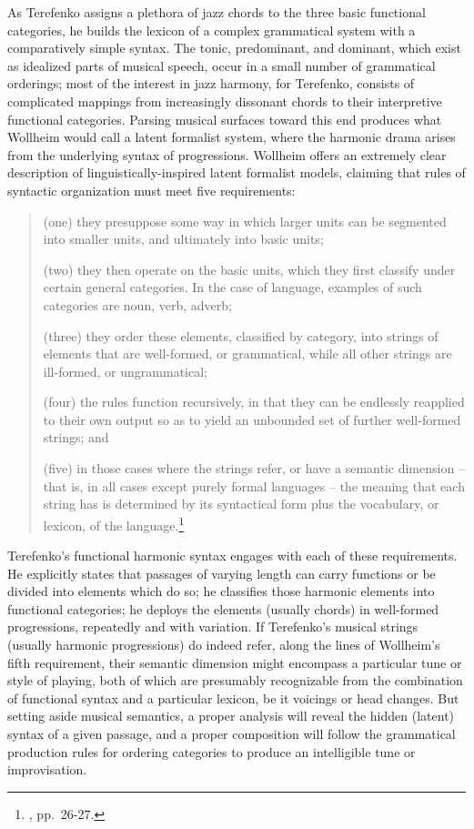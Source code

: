 As Terefenko assigns a plethora of jazz chords to the three basic functional categories, he builds the lexicon of a complex grammatical system with a comparatively simple syntax.  The tonic, predominant, and dominant, which exist as idealized parts of musical speech, occur in a small number of grammatical orderings; most of the interest in jazz harmony, for Terefenko, consists of complicated mappings from increasingly dissonant chords to their interpretive functional categories.  Parsing musical surfaces toward this end produces what Wollheim would call a latent formalist system, where the harmonic drama arises from the underlying syntax of progressions.  Wollheim offers an extremely clear description of linguistically-inspired latent formalist models, claiming that rules of syntactic organization must meet five requirements:
\begin{quote}
(one) they presuppose some way in which larger units can be segmented into smaller units, and ultimately into basic units;

(two) they then operate on the basic units, which they first classify under certain general categories.  In the case of language, examples of such categories are noun, verb, adverb;

(three) they order these elements, classified by category, into strings of elements that are well-formed, or grammatical, while all other strings are ill-formed, or ungrammatical;

(four) the rules function recursively, in that they can be endlessly reapplied to their own output so as to yield an unbounded set of further well-formed strings; and

(five) in those cases where the strings refer, or have a semantic dimension -- that is, in all cases except purely formal languages -- the meaning that each string has is determined by its syntactical form plus the vocabulary, or lexicon, of the language.\footnote{\cite{wollheim1995}, pp.\ 26-27.}
\end{quote}
Terefenko's functional harmonic syntax engages with each of these requirements.  He explicitly states that passages of varying length can carry functions or be divided into elements which do so; he classifies those harmonic elements into functional categories; he deploys the elements (usually chords) in well-formed progressions, repeatedly and with variation.  If Terefenko's musical strings (usually harmonic progressions) do indeed refer, along the lines of Wollheim's fifth requirement, their semantic dimension might encompass a particular tune or style of playing, both of which are presumably recognizable from the combination of functional syntax and a particular lexicon, be it voicings or head changes.  But setting aside musical semantics, a proper analysis will reveal the hidden (latent) syntax of a given passage, and a proper composition will follow the grammatical production rules for ordering categories to produce an intelligible tune or improvisation.

